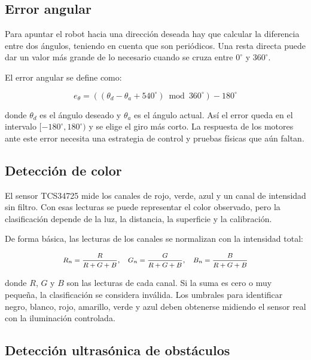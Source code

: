 \documentclass[journal]{IEEEtran}
\begin{document}
\subsection{Error angular}

Para apuntar el robot hacia una dirección deseada hay que calcular la diferencia entre dos ángulos, teniendo en cuenta que son periódicos. Una resta directa puede dar un valor más grande de lo necesario cuando se cruza entre $0^\circ$ y $360^\circ$.

El error angular se define como:

\begin{equation}
e_\theta =
\left((\theta_d-\theta_a+540^\circ)
\bmod 360^\circ\right)-180^\circ
\label{eq:error_angular}
\end{equation}

donde $\theta_d$ es el ángulo deseado y $\theta_a$ es el ángulo actual. Así el error queda en el intervalo $[-180^\circ,180^\circ)$ y se elige el giro más corto. La respuesta de los motores ante este error necesita una estrategia de control y pruebas físicas que aún faltan.

\subsection{Detección de color}

El sensor TCS34725 mide los canales de rojo, verde, azul y un canal de intensidad sin filtro. Con esas lecturas se puede representar el color observado, pero la clasificación depende de la luz, la distancia, la superficie y la calibración.

De forma básica, las lecturas de los canales se normalizan con la intensidad total:

\begin{equation}
\medmath{
R_n=\frac{R}{R+G+B},\quad
G_n=\frac{G}{R+G+B},\quad
B_n=\frac{B}{R+G+B}}
\label{eq:normalizacion_color}
\end{equation}

donde $R$, $G$ y $B$ son las lecturas de cada canal. Si la suma es cero o muy pequeña, la clasificación se considera inválida. Los umbrales para identificar negro, blanco, rojo, amarillo, verde y azul deben obtenerse midiendo el sensor real con la iluminación controlada.

\subsection{Detección ultrasónica de obstáculos}
\end{document}

